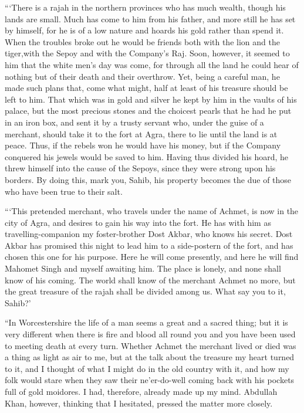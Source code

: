 \documentclass[12pt,english,oneside]{book}
\begin{document}
{}```There is a rajah in the northern provinces who has much wealth,
though his lands are small. Much has come to him from his father,
and more still he has set by himself, for he is of a low nature and
hoards his gold rather than spend it. When the troubles broke out
he would be friends both with the lion and the tiger,\mdsh{---}with
the Sepoy and with the Company's Raj. Soon, however, it seemed to
him that the white men's day was come, for through all the land he
could hear of nothing but of their death and their overthrow. Yet,
being a careful man, he made such plans that, come what might, half
at least of his treasure should be left to him. That which was in
gold and silver he kept by him in the vaults of his palace, but the
most precious stones and the choicest pearls that he had he put in
an iron box, and sent it by a trusty servant who, under the guise
of a merchant, should take it to the fort at Agra, there to lie until
the land is at peace. Thus, if the rebels won he would have his money,
but if the Company conquered his jewels would be saved to him. Having
thus divided his hoard, he threw himself into the cause of the Sepoys,
since they were strong upon his borders. By doing this, mark you,
Sahib, his property becomes the due of those who have been true to
their salt.

{}```This pretended merchant, who travels under the name of Achmet,
is now in the city of Agra, and desires to gain his way into the fort.
He has with him as travelling-companion my foster-brother Dost Akbar,
who knows his secret. Dost Akbar has promised this night to lead him
to a side-postern of the fort, and has chosen this one for his purpose.
Here he will come presently, and here he will find Mahomet Singh and
myself awaiting him. The place is lonely, and none shall know of his
coming. The world shall know of the merchant Achmet no more, but the
great treasure of the rajah shall be divided among us. What say you
to it, Sahib?'

{}``In Worcestershire the life of a man seems a great and a sacred
thing; but it is very different when there is fire and blood all round
you and you have been used to meeting death at every turn. Whether
Achmet the merchant lived or died was a thing as light as air to me,
but at the talk about the treasure my heart turned to it, and I thought
of what I might do in the old country with it, and how my folk would
stare when they saw their ne'er-do-well coming back with his pockets
full of gold moidores. I had, therefore, already made up my mind.
Abdullah Khan, however, thinking that I hesitated, pressed the matter
more closely.
\end{document}
